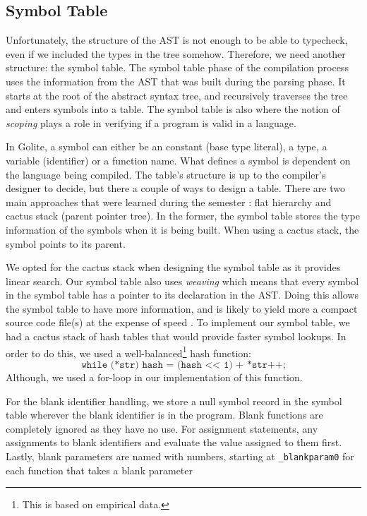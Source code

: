 \documentclass{article}
\begin{document}
\subsection{Symbol Table}

Unfortunately, the structure of the AST is not enough to be able to typecheck, even if we included the types in the tree somehow. Therefore, we need another structure: the symbol table. The symbol table phase of the compilation process uses the information from the AST that was built during the parsing phase. It starts at the root of the abstract syntax tree, and recursively traverses the tree and enters symbols into a table. The symbol table is also where the notion of \textit{scoping} plays a role in verifying if a program is valid in a language.

In Golite, a symbol can either be an constant (base type literal), a type, a variable (identifier) or a function name. What defines a symbol is dependent on the language being compiled. The table's structure is up to the compiler's designer to decide, but there a couple of ways to design a table. There are two main approaches that were learned during the semester \cite{symtab}: flat hierarchy and cactus stack (parent pointer tree). In the former, the symbol table stores the type information of the symbols when it is being built. When using a cactus stack, the symbol points to its parent.

We opted for the cactus stack when designing the symbol table as it provides linear search. Our symbol table also uses \textit{weaving} which means that every symbol in the symbol table has a pointer to its declaration in the AST. Doing this allows the symbol table to have more information, and is likely to yield more a compact source code file(s) at the expense of speed \cite{symtab}. To implement our symbol table, we had a cactus stack of hash tables that would provide faster symbol lookups. In order to do this, we used a well-balanced\footnote{This is based on empirical data.} hash function:
\[
    \texttt{while (*str) hash = (hash << 1) + *str++;}
\]
Although, we used a for-loop in our implementation of this function.

For the blank identifier handling, we store a null symbol record in the symbol table wherever the blank identifier is in the program. Blank functions are completely ignored as they have no use. For assignment statements, any assignments to blank identifiers and evaluate the value assigned to them first. Lastly, blank parameters are named with numbers, starting at \verb|_blankparam0| for each function that takes a blank parameter
\end{document}

